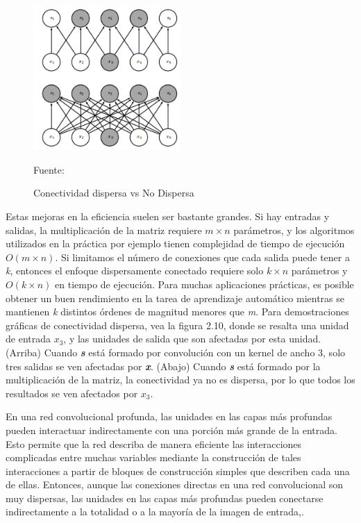 		\begin{figure}[H]
		\begin{center}
		\includegraphics[width=0.5\textwidth]{images/marcoteorico/sparceCon}
		\end{center}
		\begin{center}
		\caption{\footnotesize \small{Conectividad dispersa vs No Dispersa}}
		\vskip -0.3cm  
		{\small{Fuente:\citep{Goodfellow-et-al-2016}}}
		\end{center}
		\vspace{-1.5em}
		\end{figure} 	

		Estas mejoras en la eficiencia suelen ser bastante grandes. Si hay entradas y salidas, la multiplicación de la matriz requiere $m \times n$ parámetros, y los algoritmos utilizados en la práctica por ejemplo tienen complejidad de tiempo de ejecución $O(m \times n)$. Si limitamos el número de conexiones que cada salida puede tener a {\textit k}, entonces el enfoque dispersamente conectado requiere solo $k \times n$ parámetros y $O(k \times n)$ en tiempo de ejecución. Para muchas aplicaciones prácticas, es posible obtener un buen rendimiento en la tarea de aprendizaje automático mientras se mantienen {\textit k} distintos órdenes de magnitud menores que {\textit m}. Para demostraciones gráficas de conectividad dispersa, vea la figura 2.10, donde se resalta una unidad de entrada $x_{3}$, y las unidades de salida que son afectadas por esta unidad. (Arriba) Cuando {\bf {\textit {s}}} está formado por convolución con un kernel de ancho 3, solo tres salidas se ven afectadas por {\bf \textit  x}. (Abajo) Cuando {\bf \textit s} está formado por la multiplicación de la matriz, la conectividad ya no es dispersa, por lo que todos los resultados se ven afectados por $x_{3}$.

		\vskip 0.4cm  
		En una red convolucional profunda, las unidades en las capas más profundas pueden interactuar indirectamente con una porción más grande de la entrada. Esto permite que la red describa de manera eficiente las interacciones complicadas entre muchas variables mediante la construcción de tales interacciones a partir de bloques de construcción simples que describen cada una de ellas. Entonces, aunque las conexiones directas en una red convolucional son muy dispersas, las unidades en las capas más profundas pueden conectarse indirectamente a la totalidad o a la mayoría de la imagen de entrada,\citep{Goodfellow-et-al-2016}.
		
